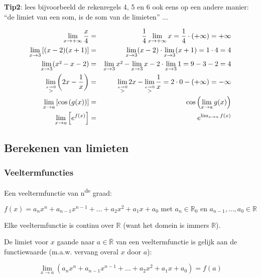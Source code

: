 \textbf{Tip2}: lees bijvoorbeeld de rekenregels 4, 5 en 6 ook eens
op een andere manier: ``de limiet van een som, is de som van de limieten''
...

\begin{voorbeeld}
\begin{eqnarray*}
\lim_{x\to+\infty}\frac{x}{4}&=&\frac{1}{4} \lim_{x\to+\infty}x=\frac{1}{4}\cdot (+\infty)=+\infty\\
\lim_{x\to3}\left[(x-2)(x+1)\right]&=& \lim_{x\to3}(x-2)\cdot  \lim_{x\to3}(x+1)=1\cdot 4=4\\
\lim_{x\to3}(x\text{\texttwosuperior}-x-2)&=& \lim_{x\to3}x\text{\texttwosuperior}- \lim_{x\to3}x-2\cdot  \lim_{x\to3}1=9-3-2=4\\
\lim_{\overset{x\rightarrow0}{>}}\left(2x-\frac{1}{x}\right)&=& \lim_{\overset{x\rightarrow0}{>}}2x- \lim_{\overset{x\rightarrow0}{>}}\frac{1}{x}=2\cdot 0-\left(+\infty\right)=-\infty\\
\lim_{x\to a}\left[\cos\left(g(x)\right)\right]&=&\cos\left( \lim_{x\to a}g(x)\right)\\
\lim_{x\to a}\left[e^{f(x)}\right]&=&e^{\lim_{x\to a}f(x)}
\end{eqnarray*}
\end{voorbeeld}

\subsection{Berekenen van limieten}

\subsubsection{Veeltermfuncties}

Een veeltermfunctie van n\textsuperscript{de} graad:

\begin{equation*}
f(x)=a_{n}x^{n}+a_{n-1}x^{n-1}+\ldots+a_{2}x^{2}+a_{1}x+a_{0}\text{ met }
a_{n}\in\mathbb{R}_{0}\text{ en }a_{n-1},\ldots,a_{0}\in\mathbb{R}
\end{equation*}

Elke veeltermfunctie is continu over $\mathbb{R}$ (want
het domein is immers $\mathbb{R}$).

De limiet voor $x$ gaande naar $a\in\overline{\mathbb{R}}$
van een veeltermfunctie is gelijk aan de functiewaarde (m.a.w. vervang
overal $x$ door $a$):

\begin{equation*}
\lim_{x\to a}\left(a_{n}x^{n}+a_{n-1}x^{n-1}+\ldots+a_{2}x^{2}+a_{1}x+a_{0}\right)=f(a)
\end{equation*}

